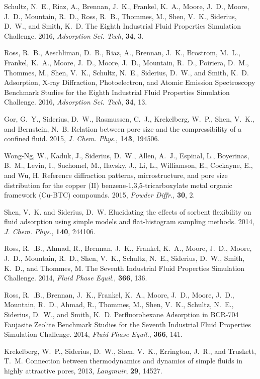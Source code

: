 Schultz, N.~E., Riaz, A., Brennan, J.~K., Frankel, K.~A., Moore, J.~D., Moore, J.~D., Mountain, R.~D., Ross, R.~B., Thommes, M., Shen, V.~K., Siderius, D.~W., and Smith, K.~D. The Eighth Industrial Fluid Properties Simulation Challenge. 2016, {\it Adsorption Sci. Tech}, {\bf 34}, 3.

Ross, R.~B., Aeschliman, D.~B., Riaz, A., Brennan, J.~K., Brostrom, M.~L., Frankel, K.~A., Moore, J.~D., Moore, J.~D., Mountain, R.~D., Poiriera, D.~M., Thommes, M., Shen, V.~K., Schultz, N.~E., Siderius, D.~W., and Smith, K.~D. Adsorption, X-ray Diffraction, Photoelectron, and Atomic Emission Spectroscopy Benchmark Studies for the Eighth Industrial Fluid Properties Simulation Challenge. 2016, {\it Adsorption Sci. Tech}, {\bf 34}, 13.

Gor, G.~Y., Siderius, D.~W., Rasmussen, C.~J., Krekelberg, W.~P., Shen, V.~K., and Bernstein, N.~B. Relation between pore size and the compressibility of a confined fluid. 2015, {\it J. Chem. Phys.}, {\bf 143}, 194506.

Wong-Ng, W., Kaduk, J., Siderius, D.~W., Allen, A.~J., Espinal, L., Boyerinas, B.~M., Levin, I., Suchomel, M., Ilavsky, J., Li, L., Williamson, E., Cockayne, E., and Wu, H. Reference diffraction patterns, microstructure, and pore size distribution for the copper (II) benzene-1,3,5-tricarboxylate metal organic framework ({Cu-BTC}) compounds. 2015, {\it Powder Diffr.}, {\bf 30}, 2.

Shen, V.~K. and Siderius, D.~W. Elucidating the effects of sorbent flexibility on fluid adsorption using simple models and flat-histogram sampling methods. 2014, {\it J. Chem. Phys.}, {\bf 140}, 244106.

Ross, R.~.B., Ahmad, R., Brennan, J.~K., Frankel, K.~A., Moore, J.~D., Moore, J.~D., Mountain, R.~D., Shen, V.~K., Schultz, N.~E., Siderius, D.~W., Smith, K.~D., and Thommes, M. The Seventh Industrial Fluid Properties Simulation Challenge. 2014, {\it Fluid Phase Equil.}, {\bf 366}, 136.

Ross, R.~.B., Brennan, J.~K., Frankel, K.~A., Moore, J.~D., Moore, J.~D., Mountain, R.~D., Ahmad, R., Thommes, M., Shen, V.~K., Schultz, N.~E., Siderius, D.~W., and Smith, K.~D. Perfluorohexane Adsorption in BCR-704 Faujasite Zeolite Benchmark Studies for the Seventh Industrial Fluid Properties Simulation Challenge. 2014, {\it Fluid Phase Equil.}, {\bf 366}, 141.

Krekelberg, W.~P., Siderius, D.~W., Shen, V.~K., Errington, J.~R., and Truskett, T.~M. Connection between thermodynamics and dynamics of simple fluids in highly attractive pores, 2013, {\it Langmuir}, {\bf 29},  14527.

